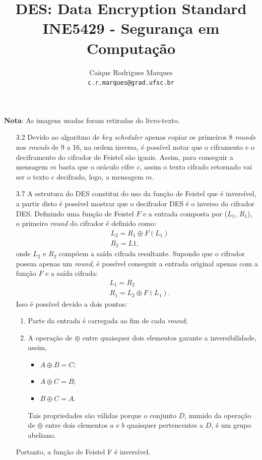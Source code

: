 \documentclass{article}
\title{\textbf{DES: Data Encryption Standard \\
        \large INE5429 - Segurança em Computação}}
\author{
    Caique Rodrigues Marques \\
    {\texttt{c.r.marques@grad.ufsc.br}}
}
\date{}
\begin{document}
\maketitle


\textbf{Nota}: As imagens usadas foram retiradas do
livro-texto\cite{stallings2014}.

\begin{enumerate}
    \item[3.2] Devido ao algoritmo de \textit{key scheduler} apenas copiar os
        primeiros 8 \textit{rounds} nos \textit{rounds} de 9 a 16, na ordem
        inversa, é possível notar que o ciframento e o deciframento do cifrador
        de Feistel são iguais. Assim, para conseguir a mensagem $m$ basta que o
        oráculo cifre $c$, assim o texto cifrado retornado vai ser o texto $c$
        decifrado, logo, a mensagem $m$.

    \item[3.7] A estrutura do DES constitui do uso da função de Feistel que é
        inversível, a partir disto é possível mostrar que o decifrador DES é o
        inverso do cifrador DES. Definindo uma função de Feistel $F$ e a
        entrada composta por ($L_{1}$, $R_{1}$), o primeiro \textit{round} do
        cifrador é definido como:
    \begin{align*}
        & L_{2} = R_{1} \oplus F(L_{1}) \\
        & R_{2} = L{1},
    \end{align*}
    onde $L_{2}$ e $R_{2}$ compõem a saída cifrada resultante. Supondo que o
        cifrador possua apenas um \textit{round}, é possível conseguir a
        entrada original apenas com a função $F$ e a saída cifrada:
    \begin{align*}
        & L_{1} = R_{2} \\
        & R_{1} = L_{2} \oplus F(L_{1}).
    \end{align*}
    Isso é possível devido a dois pontos:
    \begin{enumerate}
        \item Parte da entrada é carregada ao fim de cada \textit{round};
        \item A operação de $\oplus$ entre quaisquer dois elementos garante a
            inversibilidade, assim, 
        \begin{itemize}
            \item $A \oplus B = C$;
            \item $A \oplus C = B$;
            \item $B \oplus C = A$.
        \end{itemize}
        Tais propriedades são válidas porque o conjunto $D$, munido da operação
            de $\oplus$ entre dois elementos $a$ e $b$ quaisquer pertencentes a
            $D$, é um grupo abeliano.\footnotemark[1]
    \end{enumerate}
    Portanto, a função de Feistel F é inversível.
    

\end{enumerate}
\end{document}
